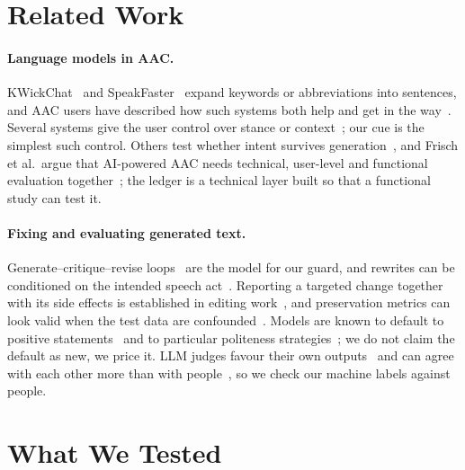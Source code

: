 \documentclass[letterpaper]{article} %
\begin{document}
\section{Related Work}
\label{sec:related}
\paragraph{Language models in AAC.}
KWickChat~\cite{shen2022kwickchat} and SpeakFaster~\cite{cai2024speakfaster} expand keywords or abbreviations into sentences, and AAC users have described how such systems both help and get in the way~\cite{valencia2023less}.
Several systems give the user control over stance or context~\cite{valencia2024compa,mao2025designprobes,xiang2025socializechat,lacosse2026cognitivesteering}; our cue is the simplest such control.
Others test whether intent survives generation~\cite{choudhury2025alignment}, and Frisch et al.\ argue that AI-powered AAC needs technical, user-level and functional evaluation together~\cite{frisch2026complicated}; the ledger is a technical layer built so that a functional study can test it.

\paragraph{Fixing and evaluating generated text.}
Generate--critique--revise loops~\cite{madaan2023selfrefine,gou2024critic} are the model for our guard, and rewrites can be conditioned on the intended speech act~\cite{qu2023conditioning}.
Reporting a targeted change together with its side effects is established in editing work~\cite{ziegenbein2026editing,elgaar2025lingconv}, and preservation metrics can look valid when the test data are confounded~\cite{pauli2025stylegap}.
Models are known to default to positive statements~\cite{chen2023say} and to particular politeness strategies~\cite{zhao2025politeness}; we do not claim the default as new, we price it.
LLM judges favour their own outputs~\cite{zheng2023judging,panickssery2024selfpreference} and can agree with each other more than with people~\cite{wang2026politemisaligned}, so we check our machine labels against people.

\section{What We Tested}
\label{sec:setting}
\end{document}
